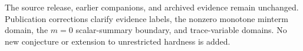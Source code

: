 The source release, earlier companions, and archived evidence remain
unchanged. Publication corrections clarify evidence labels, the nonzero
monotone minterm domain, the $m=0$ scalar-summary boundary, and trace-variable
domains. No new conjecture or extension to unrestricted hardness is added.



